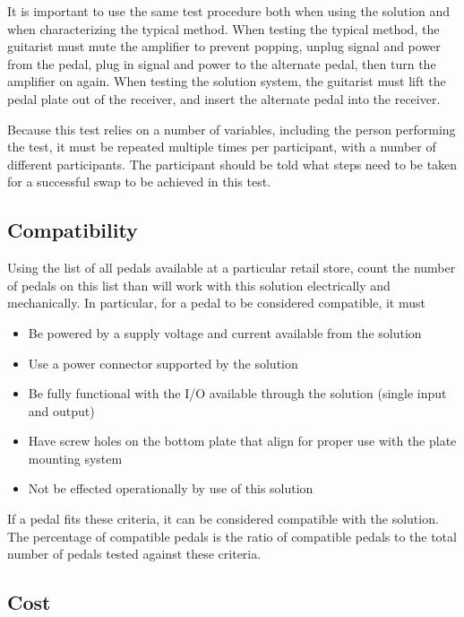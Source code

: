 \documentclass{article}
\begin{document}
	It is important to use the same test procedure both when using the solution and when characterizing the typical method.  When testing the typical method, the guitarist must mute the amplifier to prevent popping, unplug signal and power from the pedal, plug in signal and power to the alternate pedal, then turn the amplifier on again.  When testing the solution system, the guitarist must lift the pedal plate out of the receiver, and insert the alternate pedal into the receiver.

	Because this test relies on a number of variables, including the person performing the test, it must be repeated multiple times per participant, with a number of different participants.  The participant should be told what steps need to be taken for a successful swap to be achieved in this test.

	\subsection{Compatibility}

	Using the list of all pedals available at a particular retail store, count the number of pedals on this list than will work with this solution electrically and mechanically.  In particular, for a pedal to be considered compatible, it must

	\begin{itemize}
		\item Be powered by a supply voltage and current available from the solution
		\item Use a power connector supported by the solution
		\item Be fully functional with the I/O available through the solution (single input and output)
		\item Have screw holes on the bottom plate that align for proper use with the plate mounting system
		\item Not be effected operationally by use of this solution
	\end{itemize} 

	If a pedal fits these criteria, it can be considered compatible with the solution.  The percentage of compatible pedals is the ratio of compatible pedals to the total number of pedals tested against these criteria.

	\subsection{Cost}
\end{document}
